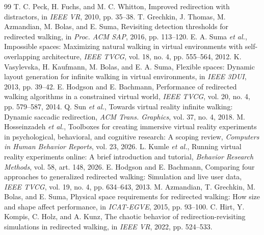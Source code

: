 \begin{thebibliography}{99}
 T. C. Peck, H. Fuchs, and M. C. Whitton, Improved redirection with distractors, in \emph{IEEE VR}, 2010, pp. 35--38.
 T. Grechkin, J. Thomas, M. Azmandian, M. Bolas, and E. Suma, Revisiting detection thresholds for redirected walking, in \emph{Proc. ACM SAP}, 2016, pp. 113--120.
 E. A. Suma \emph{et al.}, Impossible spaces: Maximizing natural walking in virtual environments with self-overlapping architecture, \emph{IEEE TVCG}, vol. 18, no. 4, pp. 555--564, 2012.
 K. Vasylevska, H. Kaufmann, M. Bolas, and E. A. Suma, Flexible spaces: Dynamic layout generation for infinite walking in virtual environments, in \emph{IEEE 3DUI}, 2013, pp. 39--42.
 E. Hodgson and E. Bachmann, Performance of redirected walking algorithms in a constrained virtual world, \emph{IEEE TVCG}, vol. 20, no. 4, pp. 579--587, 2014.
 Q. Sun \emph{et al.}, Towards virtual reality infinite walking: Dynamic saccadic redirection, \emph{ACM Trans. Graphics}, vol. 37, no. 4, 2018.
 M. Hosseinzadeh \emph{et al.}, Toolboxes for creating immersive virtual reality experiments in psychological, behavioral, and cognitive research: A scoping review, \emph{Computers in Human Behavior Reports}, vol. 23, 2026.
 L. Kumle \emph{et al.}, Running virtual reality experiments online: A brief introduction and tutorial, \emph{Behavior Research Methods}, vol. 58, art. 148, 2026.
 E. Hodgson and E. Bachmann, Comparing four approaches to generalized redirected walking: Simulation and live user data, \emph{IEEE TVCG}, vol. 19, no. 4, pp. 634--643, 2013.
 M. Azmandian, T. Grechkin, M. Bolas, and E. Suma, Physical space requirements for redirected walking: How size and shape affect performance, in \emph{ICAT-EGVE}, 2015, pp. 93--100.
 C. Hirt, Y. Kompis, C. Holz, and A. Kunz, The chaotic behavior of redirection-revisiting simulations in redirected walking, in \emph{IEEE VR}, 2022, pp. 524--533.
\end{thebibliography}
